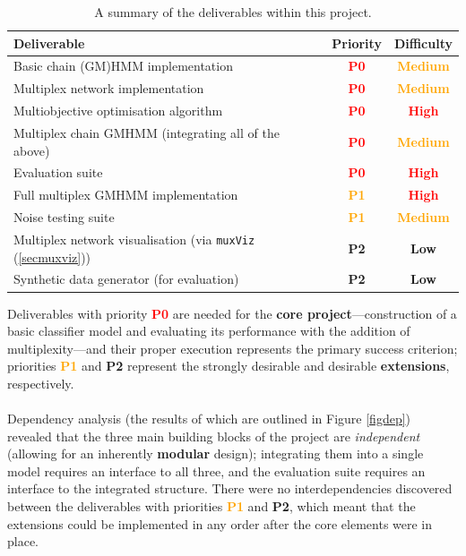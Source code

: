 \documentclass[12pt,a4paper,twoside,openright]{report}
\begin{document}
\begin{table}[H]\centering
\begin{tabular}{ l  c  c } \toprule
{\bf Deliverable} & {\bf Priority} & {\bf Difficulty}\\ \midrule
Basic chain (GM)HMM implementation & \textcolor{red}{\bf P0} & \textcolor{orange}{\bf Medium}\\
Multiplex network implementation & \textcolor{red}{\bf P0} & \textcolor{orange}{\bf Medium}\\
Multiobjective optimisation algorithm & \textcolor{red}{\bf P0} & \textcolor{red}{\bf High}\\
Multiplex chain GMHMM (integrating all of the above) & \textcolor{red}{\bf P0} & \textcolor{orange}{\bf Medium}\\
Evaluation suite & \textcolor{red}{\bf P0} & \textcolor{red}{\bf High}\\
Full multiplex GMHMM implementation & \textcolor{orange}{\bf P1} & \textcolor{red}{\bf High}\\
Noise testing suite & \textcolor{orange}{\bf P1} & \textcolor{orange}{\bf Medium}\\
Multiplex network visualisation (via \texttt{muxViz} (\cref{secmuxviz})) & \textcolor{mygreen}{\bf P2} & \textcolor{mygreen}{\bf Low}\\
Synthetic data generator (for evaluation) & \textcolor{mygreen}{\bf P2} & \textcolor{mygreen}{\bf Low}\\
\bottomrule
\end{tabular}
\caption{A summary of the deliverables within this project.}\label{tbldeliv}
\end{table}
\noindent Deliverables with priority \textcolor{red}{\bf P0} are needed for the {\bf core project}---construction of a basic classifier model and evaluating its performance with the addition of multiplexity---and their proper execution represents the primary success criterion; priorities \textcolor{orange}{\bf P1} and \textcolor{mygreen}{\bf P2} represent the strongly desirable and desirable {\bf extensions}, respectively.\\ \\
Dependency analysis (the results of which are outlined in Figure \ref{figdep}) revealed that the three main building blocks of the project are \emph{independent} (allowing for an inherently {\bf modular} design); integrating them into a single model requires an interface to all three, and the evaluation suite requires an interface to the integrated structure. There were no interdependencies discovered between the deliverables with priorities \textcolor{orange}{\bf P1} and \textcolor{mygreen}{\bf P2}, which meant that the extensions could be implemented in any order after the core elements were in place.
\end{document}
